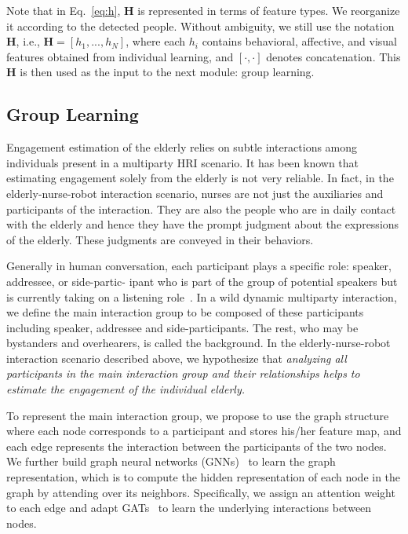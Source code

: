 \documentclass[twocolumn]{svjour3}
\begin{document}
Note that in Eq.~\ref{eq:h}, $\mathbf{H}$ is represented in terms of feature types. We reorganize it according to the detected people. Without ambiguity, we still use the notation $\mathbf{H}$, i.e., $\mathbf{H} = \left[h_1, ..., h_N\right]$, where each $h_i$ contains behavioral, affective, and visual features obtained from individual learning, and $\left[\cdot, \cdot\right]$ denotes concatenation. This $\mathbf{H}$ is then used as the input to the next module: group learning.


\subsection{Group Learning}
\label{subs:Group_Learning}

Engagement estimation of the elderly relies on subtle interactions among individuals present in a multiparty HRI scenario. It has been known that estimating engagement solely from the elderly is not very reliable. In fact, in the elderly-nurse-robot interaction scenario, nurses are not just the auxiliaries and participants of the interaction. They are also the people who are in daily contact with the elderly and hence they have the prompt judgment about the expressions of the elderly. These judgments are conveyed in their behaviors. 

Generally in human conversation, each participant plays a specific role: speaker, addressee, or side-partic- ipant who is part of the group of potential speakers but is currently taking on a listening role~\cite{Goffman1981Forms,Clark1996Using}. In a wild dynamic multiparty interaction, we define the main interaction group to be composed of these participants including speaker, addressee and side-participants. The rest, who may be bystanders and overhearers, is called the background.
In the elderly-nurse-robot interaction scenario described above, we hypothesize that \textit{analyzing all participants in the main interaction group and their relationships helps to estimate the engagement of the individual elderly.} 

To represent the main interaction group, we propose to use the graph structure where each node corresponds to a participant and stores his/her feature map, and each edge represents the interaction between the participants of the two nodes. We further build graph neural networks (GNNs)~\cite{Scarselli2008Graph} to learn the graph representation, which is to compute the hidden representation of each node in the graph by attending over its neighbors.  Specifically, we assign an attention weight to each edge and adapt GATs~\cite{Velivckovic2017Graph} to learn the underlying interactions between nodes. 
\end{document}
